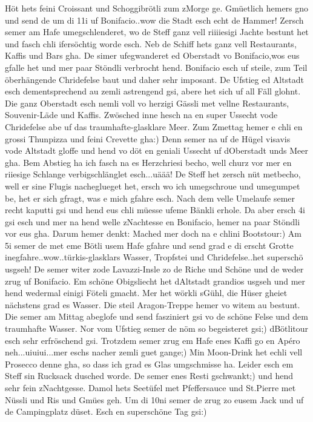 Höt hets feini Croissant und Schoggibrötli zum zMorge ge. Gmüetlich hemers gno und send de um di 11i uf Bonifacio..wow die Stadt esch echt de Hammer! Zersch semer am Hafe umegschlenderet, wo de Steff ganz vell riiiiesigi Jachte bestunt het und fasch chli ifersöchtig worde esch. Neb de Schiff hets ganz vell Restaurants, Kaffis und Bars gha. De simer ufegwanderet ed Oberstadt vo Bonifacio,wos eus gfalle het und mer paar Stöndli verbrocht hend. Bonifacio esch uf steile, zum Teil öberhängende Chridefelse baut und daher sehr imposant. De Ufstieg ed Altstadt esch dementsprechend au zemli astrengend gsi, abere het sich uf all Fäll glohnt. Die ganz Oberstadt esch nemli voll vo herzigi Gässli met vellne Restaurants, Souvenir-Läde und Kaffis. Zwösched inne hesch na en super Ussecht vode Chridefelse abe uf das traumhafte-glasklare Meer. Zum Zmettag hemer e chli en grossi Thunpizza und feini Crevette gha:) Denn semer na uf de Hügel visavis vode Altstadt gloffe und hend vo döt en geniali Ussecht uf dOberstadt unds Meer gha. Bem Abstieg ha ich fasch na es Herzchriesi becho, well churz vor mer en riiesige Schlange verbigschlänglet esch...uäää! De Steff het zersch nüt metbecho, well er sine Flugis nacheglueget het, ersch wo ich umegschroue und umegumpet be, het er sich gfragt, was e mich gfahre esch. Nach dem velle Umelaufe semer recht kaputti gsi und hend eus chli müesse ufeme Bänkli erhole. Da aber ersch 4i gsi esch und mer na hend welle zNachtesse en Bonifacio, hemer na paar Stöndli vor eus gha. Darum hemer denkt: Mached mer doch na e chlini Bootstour:) Am 5i semer de met eme Bötli usem Hafe gfahre und send grad e di erscht Grotte inegfahre..wow..türkis-glasklars Wasser, Tropfstei und Chridefelse..het superschö usgseh! De semer witer zode Lavazzi-Insle zo de Riche und Schöne und de weder zrug uf Bonifacio. Em schöne Obigsliecht het dAltstadt grandios usgseh und mer hend wedermal einigi Föteli gmacht. Mer het wörkli sGühl, die Hüser gheiet nächstens grad es Wasser. Die steil Aragon-Treppe hemer vo witem au bestunt. Die semer am Mittag abeglofe und send fasziniert gsi vo de schöne Felse und dem traumhafte Wasser. Nor vom Ufstieg semer de nöm so begeisteret gsi;) dBötlitour esch sehr erfröschend gsi. Trotzdem semer zrug em Hafe enes Kaffi go en Apéro neh...uiuiui...mer eschs nacher zemli guet gange;) Min Moon-Drink het echli vell Prosecco denne gha, so dass ich grad es Glas umgschmisse ha. Leider esch em Steff sin Rucksack dusched worde. De semer enes Resti gschwankt;) und hend sehr fein zNachtgesse. Damol hets Seetüfel met Pfeffersauce und St.Pierre met Nüssli und Ris und Gmües geh. Um di 10ni semer de zrug zo eusem Jack und uf de Campingplatz düset. Esch en superschöne Tag gsi:)

